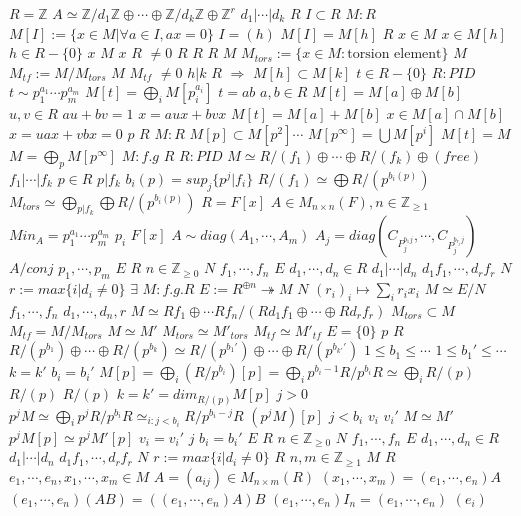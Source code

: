\documentclass{article}
\begin{document}
$R=\mathbb{Z}$
$A \simeq \mathbb{Z}/d_1\mathbb{Z}\oplus\cdots\oplus\mathbb{Z}/d_k\mathbb{Z}\oplus\mathbb{Z}^r$
$d_1|\cdots|d_k$
$R$
$I \subset R$
$M:R$
$M[I]:=\{x \in M| \forall a \in I,ax=0\}$
$I=(h)$
$M[I]=M[h]$
$R$
$x \in M$
$x \in M[h]$
$h \in R-\{0\}$
$x$
$M$
$x$
$R$
$\neq 0$
$R$
$R$
$R$
$M$
$M_{tors}:=\{x \in M:\text{torsion element}\}$
$M$
$M_{tf}:=M/M_{tors}$
$M$
$M_{tf}$
$\neq 0$
$h|k$
$R$
$\Longrightarrow$
$M[h] \subset M[k]$
$t \in R-\{0\}$
$R:PID$
$t \sim p_1^{a_1}\cdots p_m^{a_m}$
$M[t]=\bigoplus_iM[p_i^{a_i}]$
$t=ab$
$a,b \in R$
$M[t]=M[a]\oplus M[b]$
$u,v \in R$
$au+bv=1$
$x=aux+bvx$
$M[t]=M[a]+M[b]$
$x \in M[a]\cap M[b]$
$x=uax+vbx=0$
$p$
$R$
$M:R$
$M[p] \subset M[p^2] \cdots$
$M[p^\infty]=\bigcup M[p^i]$
$M[t]=M$
$M=\bigoplus_p M[p^\infty]$
$M:f.g$
$R$
$R:PID$
$M \simeq R/(f_1) \oplus \cdots \oplus R/(f_k) \oplus (free)$
$f_1|\cdots|f_k$
$p \in R$
$p|f_k$
$b_i(p)=sup_j\{p^j|f_i\}$
$R/(f_1) \simeq \bigoplus R/(p^{b_i(p)})$
$M_{tors} \simeq \bigoplus_{p|f_k}\bigoplus R/(p^{b_i(p)})$
$R=F[x]$
$A \in M_{n \times n}(F),n \in \mathbb{Z}_{\geq 1}$
$Min_A=p_1^{a_1} \cdots p_m^{a_m}$
$p_i$
$F[x]$
$A \sim diag(A_1,\cdots,A_m)$
$A_j=diag(C_{P_j^{b_1j}},\cdots,C_{P_j^{b_{r_j}j}})$
$A/conj$
$p_1,\cdots,p_m$
$E$
$R$
$n \in \mathbb{Z}_{\geq 0}$
$N$
$f_1,\cdots,f_n$
$E$
$d_1,\cdots,d_n \in R$
$d_1|\cdots|d_n$
$d_1f_1, \cdots,d_rf_r$
$N$
$r:=max\{i|d_i \neq 0\}$
$\exists$
$M:f.g.R$
$E:=R^{\oplus n} \twoheadrightarrow M$
$N$
$(r_i)_i \mapsto \sum_{i}r_ix_i$
$M \simeq E/N$
$f_1,\cdots,f_n$
$d_1,\cdots,d_n,r$
$M \simeq Rf_1 \oplus \cdots Rf_n/(Rd_1f_1 \oplus \cdots\oplus Rd_rf_r)$
$M_{tors} \subset M$
$M_{tf}=M/M_{tors}$
$M \simeq M'$
$M_{tors} \simeq M'_{tors}$
$M_{tf} \simeq M'_{tf}$
$E=\{0\}$
$p$
$R$
$R/(p^{b_1}) \oplus \cdots \oplus R/(p^{b_k}) \simeq R/(p^{b_1'}) \oplus \cdots \oplus R/(p^{b_{k'}'})$
$1 \leq b_1 \leq \cdots$
$1 \leq b_1' \leq \cdots$
$k=k'$
$b_i=b_i'$
$M[p]=\bigoplus_i(R/p^{b_i})[p]=\bigoplus_i p^{b_i-1}R/p^{b_i}R \simeq \bigoplus_iR/(p)$
$R/(p)$
$R/(p)$
$k=k'=dim_{R/(p)}M[p]$
$j>0$
$p^jM \simeq \bigoplus_ip^jR/p^{b_i}R \simeq_{i:j<b_i}R/p^{b_i-j}R$
$(p^jM)[p]$
$j<b_i$
$v_i$
$v_i'$
$M \simeq M'$
$p^jM[p] \simeq p^{j}M'[p]$
$v_i=v_i'$
$j$
$b_i=b_i'$
$E$
$R$
$n \in \mathbb{Z}_{\geq 0}$
$N$
$f_1,\cdots,f_n$
$E$
$d_1,\cdots,d_n \in R$
$d_1|\cdots|d_n$
$d_1f_1, \cdots,d_rf_r$
$N$
$r:=max\{i|d_i \neq 0\}$
$R$
$n,m \in \mathbb{Z}_{\geq 1}$
$M$
$R$
$e_1,\cdots,e_n,x_1,\cdots,x_m \in M$
$A=(a_{ij}) \in M_{n \times m}(R)$
$(x_1,\cdots,x_m)=(e_1,\cdots,e_n)A$
$(e_1,\cdots,e_n)(AB)=((e_1,\cdots,e_n)A)B$
$(e_1,\cdots,e_n)I_n=(e_1,\cdots,e_n)$
$(e_i)$
\end{document}
